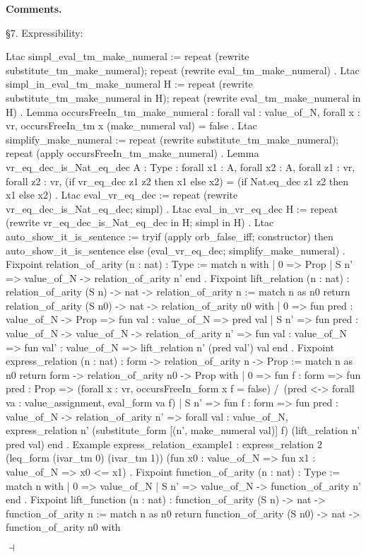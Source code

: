 \documentclass[12pt]{paper}
\newenvironment{context}[1][]
{ \noindent \textbf{{#1}.}
}
{ \hfill $ \dashv $
}
\begin{document}
\begin{context}[Comments]
    \S7. Expressibility:
    \begin{coqcode}
Ltac simpl_eval_tm_make_numeral :=
  repeat (rewrite substitute_tm_make_numeral); repeat (rewrite eval_tm_make_numeral)
.
Ltac simpl_in_eval_tm_make_numeral H :=
  repeat (rewrite substitute_tm_make_numeral in H); repeat (rewrite eval_tm_make_numeral in H)
.
Lemma occursFreeIn_tm_make_numeral :
  forall val : value_of_N,
  forall x : vr,
  occursFreeIn_tm x (make_numeral val) = false
.
Ltac simplify_make_numeral :=
  repeat (rewrite substitute_tm_make_numeral); repeat (apply occursFreeIn_tm_make_numeral)
.
Lemma vr_eq_dec_is_Nat_eq_dec {A : Type} :
  forall x1 : A,
  forall x2 : A,
  forall z1 : vr,
  forall z2 : vr,
  (if vr_eq_dec z1 z2 then x1 else x2) = (if Nat.eq_dec z1 z2 then x1 else x2)
.
Ltac eval_vr_eq_dec :=
  repeat (rewrite vr_eq_dec_is_Nat_eq_dec; simpl)
.
Ltac eval_in_vr_eq_dec H :=
  repeat (rewrite vr_eq_dec_is_Nat_eq_dec in H; simpl in H)
.
Ltac auto_show_it_is_sentence :=
  tryif (apply orb_false_iff; constructor) then auto_show_it_is_sentence else (eval_vr_eq_dec; simplify_make_numeral)
.
Fixpoint relation_of_arity (n : nat) : Type :=
  match n with
  | 0 => Prop
  | S n' => value_of_N -> relation_of_arity n'
  end
.
Fixpoint lift_relation (n : nat) : relation_of_arity (S n) -> nat -> relation_of_arity n :=
  match n as n0 return relation_of_arity (S n0) -> nat -> relation_of_arity n0 with
  | 0 =>
    fun pred : value_of_N -> Prop =>
    fun val : value_of_N =>
    pred val
  | S n' =>
    fun pred : value_of_N -> value_of_N -> relation_of_arity n' =>
    fun val : value_of_N =>
    fun val' : value_of_N =>
    lift_relation n' (pred val') val 
  end
.
Fixpoint express_relation (n : nat) : form -> relation_of_arity n -> Prop :=
  match n as n0 return form -> relation_of_arity n0 -> Prop with
  | 0 =>
    fun f : form =>
    fun pred : Prop =>
    (forall x : vr, occursFreeIn_form x f = false) /\ (pred <-> forall va : value_assignment, eval_form va f)
  | S n' =>
    fun f : form =>
    fun pred : value_of_N -> relation_of_arity n' =>
    forall val : value_of_N, express_relation n' (substitute_form [(n', make_numeral val)] f) (lift_relation n' pred val)
  end
.
Example express_relation_example1 :
  express_relation 2 (leq_form (ivar_tm 0) (ivar_tm 1)) (fun x0 : value_of_N => fun x1 : value_of_N => x0 <= x1)
.
Fixpoint function_of_arity (n : nat) : Type :=
  match n with
  | 0 => value_of_N
  | S n' => value_of_N -> function_of_arity n'
  end
.
Fixpoint lift_function (n : nat) : function_of_arity (S n) -> nat -> function_of_arity n :=
  match n as n0 return function_of_arity (S n0) -> nat -> function_of_arity n0 with

\end{coqcode}
\end{context}
\end{document}
